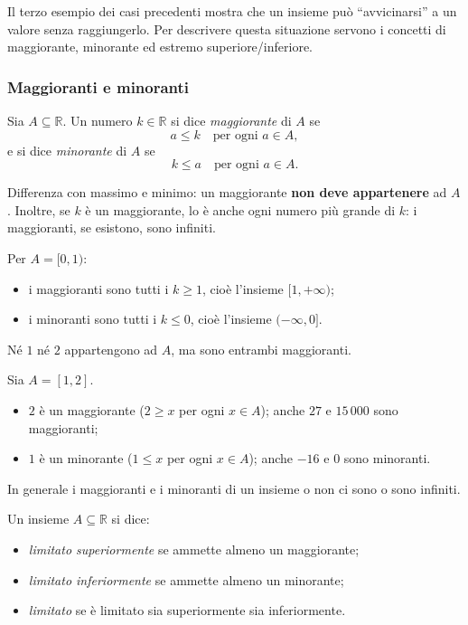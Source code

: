 \documentclass[11pt,a4paper]{article}
\begin{document}
Il terzo esempio dei casi precedenti mostra che un insieme può ``avvicinarsi'' a un valore senza
raggiungerlo. Per descrivere questa situazione servono i concetti di
maggiorante, minorante ed estremo superiore/inferiore.

\subsubsection{Maggioranti e minoranti}

\begin{definizione}
Sia $A \subseteq \mathbb{R}$. Un numero $k \in \mathbb{R}$ si dice
\emph{maggiorante} di $A$ se
\[
a \leq k \quad \text{per ogni } a \in A,
\]
e si dice \emph{minorante} di $A$ se
\[
k \leq a \quad \text{per ogni } a \in A.
\]
\end{definizione}

Differenza con massimo e minimo: un maggiorante \textbf{non deve
appartenere} ad $A$. Inoltre, se $k$ è un maggiorante, lo è anche ogni
numero più grande di $k$: i maggioranti, se esistono, sono infiniti.

\begin{esempio}
Per $A = [0, 1)$:
\begin{itemize}
    \item i maggioranti sono tutti i $k \geq 1$, cioè l'insieme $[1, +\infty)$;
    \item i minoranti sono tutti i $k \leq 0$, cioè l'insieme $(-\infty, 0]$.
\end{itemize}
Né $1$ né $2$ appartengono ad $A$, ma sono entrambi maggioranti.
\end{esempio}


\begin{esempio}
Sia $A = [1, 2]$.
\begin{itemize}
    \item $2$ è un maggiorante ($2 \geq x$ per ogni $x \in A$); anche $27$ e
          $15\,000$ sono maggioranti;
    \item $1$ è un minorante ($1 \leq x$ per ogni $x \in A$); anche $-16$ e $0$
          sono minoranti.
\end{itemize}
In generale i maggioranti e i minoranti di un insieme o non ci sono o sono
infiniti.
\end{esempio}

\begin{definizione}
Un insieme $A \subseteq \mathbb{R}$ si dice:
\begin{itemize}
    \item \emph{limitato superiormente} se ammette almeno un maggiorante;
    \item \emph{limitato inferiormente} se ammette almeno un minorante;
    \item \emph{limitato} se è limitato sia superiormente sia inferiormente.
\end{itemize}
\end{definizione}
\end{document}

